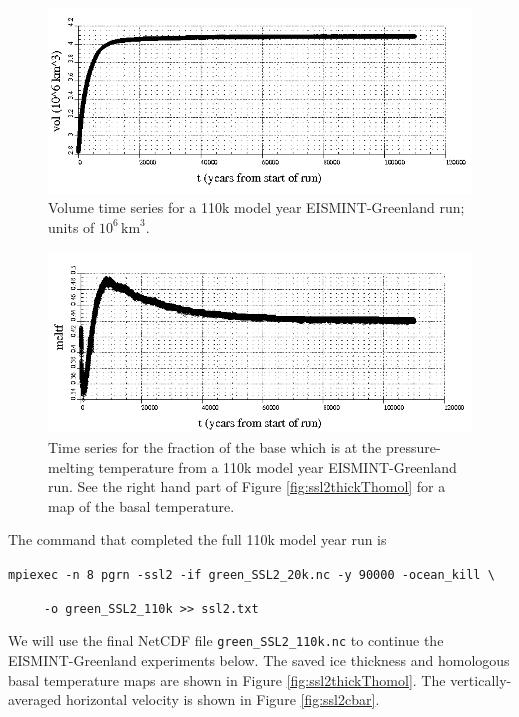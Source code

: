\documentclass[11pt,final]{amsart}
\begin{document}
\begin{figure}[ht]
\includegraphics[width=6.0in,keepaspectratio=true]{figs/eisgrn_volseries}
\caption{Volume time series for a 110k model year EISMINT-Greenland run; units of $10^{6}\,\text{km}^3$.}
\label{fig:eisgrnvolseries}
\end{figure}

\begin{figure}[ht]
\includegraphics[width=6.0in,keepaspectratio=true]{figs/eisgrn_meltfseries}
\caption{Time series for the fraction of the base which is at the pressure-melting temperature from a 110k model year EISMINT-Greenland run.  See the right hand part of Figure \ref{fig:ssl2thickThomol} for a map of the basal temperature.}
\label{fig:eisgrnmeltfseries}
\end{figure}

The command that completed the full 110k model year run is 

\verb|mpiexec -n 8 pgrn -ssl2 -if green_SSL2_20k.nc -y 90000 -ocean_kill \|

\verb|     -o green_SSL2_110k >> ssl2.txt|

We will use the final NetCDF file \verb|green_SSL2_110k.nc| to continue the EISMINT-Greenland experiments below.  The saved ice thickness and homologous basal temperature maps are shown in Figure \ref{fig:ssl2thickThomol}.  The vertically-averaged horizontal velocity is shown in Figure \ref{fig:ssl2cbar}.
\end{document}
